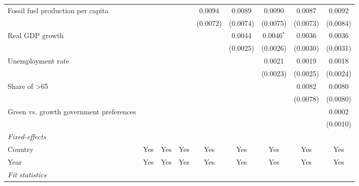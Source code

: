 \begin{table}[htbp]
\begin{tabular}{lcccccccc}
      Fossil fuel production per capita       &          &               &                       & 0.0094   & 0.0089   & 0.0090       & 0.0087       & 0.0092\\   
                                              &          &               &                       & (0.0072) & (0.0074) & (0.0075)     & (0.0073)     & (0.0084)\\   
      Real GDP growth                         &          &               &                       &          & 0.0044   & 0.0046$^{*}$ & 0.0036       & 0.0036\\   
                                              &          &               &                       &          & (0.0025) & (0.0026)     & (0.0030)     & (0.0031)\\   
      Unemployment rate                       &          &               &                       &          &          & 0.0021       & 0.0019       & 0.0018\\   
                                              &          &               &                       &          &          & (0.0023)     & (0.0025)     & (0.0024)\\   
      Share of >65                            &          &               &                       &          &          &              & 0.0082       & 0.0080\\   
                                              &          &               &                       &          &          &              & (0.0078)     & (0.0080)\\   
      Green vs. growth government preferences &          &               &                       &          &          &              &              & 0.0002\\   
                                              &          &               &                       &          &          &              &              & (0.0010)\\   
      \midrule
      \emph{Fixed-effects}\\
      Country                                 & Yes      & Yes           & Yes                   & Yes      & Yes      & Yes          & Yes          & Yes\\  
      Year                                    & Yes      & Yes           & Yes                   & Yes      & Yes      & Yes          & Yes          & Yes\\  
      \midrule
      \emph{Fit statistics}\\

\end{tabular}
\end{table}
